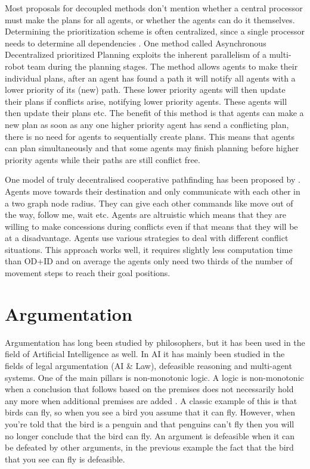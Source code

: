 \documentclass[a4paper]{article}
\begin{document}
Most proposals for decoupled methods don't mention whether a central processor 
must make the plans for all agents, or whether the agents can do it themselves. 
Determining the prioritization scheme is often centralized, since a 
single processor needs to determine all dependencies \cite{bennewitz2002}. One 
method called Asynchronous Decentralized prioritized Planning \cite{cap2012} 
exploits the inherent parallelism of a multi-robot team during the planning 
stages. The method allows 
agents to make their individual plans, after an agent has found a path it will 
notify all agents with a lower priority of its (new) path. These lower priority 
agents will then update their plans if conflicts arise, notifying lower 
priority agents. These agents will then update their plans etc. The benefit of 
this method is that agents can make a new plan as soon as any one higher 
priority agent has send a conflicting plan, there is no need for agents to 
sequentially create plans. This means that agents can plan simultaneously and 
that some agents may finish planning before higher priority agents while their 
paths are still conflict free.

One model of truly decentralised cooperative pathfinding has been proposed by 
\cite{wei2016}. Agents move towards their destination and only communicate with 
each other in a two graph node radius. They can give each other commands like 
move out of the way, follow me, wait etc. Agents are altruistic which means 
that they are willing to make concessions during conflicts even if that means 
that they will be at a disadvantage. Agents use various strategies to deal with 
different conflict situations. This approach works well, it requires slightly 
less computation time than OD+ID and on average the agents only need two thirds 
of the number of movement steps to reach their goal positions.

\section{Argumentation}
Argumentation has long been studied by philosophers, but it has been used in
the field of Artificial Intelligence as well. In AI it has mainly been studied 
in the fields of
legal argumentation (AI \& Law), defeasible reasoning and multi-agent systems.
One of the main pillars is non-monotonic logic. A logic is non-monotonic when a
conclusion that follows based on the premises does not necessarily hold any
more when additional premises are added \cite{vaneemeren2014}. A classic
example of this is that birds can fly, so when you see a bird you assume that
it can fly. However, when you're told that the bird is a penguin and that
penguins can't fly then you will no longer conclude that the bird can fly. An
argument is defeasible when it can be defeated by other arguments, in the
previous example the fact that the bird that you see can fly is defeasible.
\end{document}
